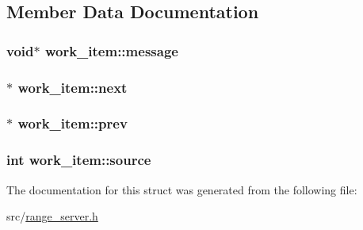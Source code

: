 \subsection{Member Data Documentation}
\hypertarget{structwork__item_a2c6449b530233592562d05debbab126f}{
\subsubsection[{message}]{\setlength{\rightskip}{0pt plus 5cm}void$\ast$ work\-\_\-item\-::message}}\label{structwork__item_a2c6449b530233592562d05debbab126f}
\hypertarget{structwork__item_a63063b910e219526f27dcd391ed4af38}{
\subsubsection[{next}]{$\ast$ work\-\_\-item\-::next}}\label{structwork__item_a63063b910e219526f27dcd391ed4af38}
\hypertarget{structwork__item_adf400e3104c2071b1f192d48690408b4}{
\subsubsection[{prev}]{$\ast$ work\-\_\-item\-::prev}}\label{structwork__item_adf400e3104c2071b1f192d48690408b4}
\hypertarget{structwork__item_aafb1f7c16f606a3fd5a9ee24d3a34a42}{
\subsubsection[{source}]{\setlength{\rightskip}{0pt plus 5cm}int work\-\_\-item\-::source}}\label{structwork__item_aafb1f7c16f606a3fd5a9ee24d3a34a42}


The documentation for this struct was generated from the following file\-:\begin{DoxyCompactItemize}
\item 
src/\hyperlink{range__server_8h}{range\-\_\-server.\-h}\end{DoxyCompactItemize}

